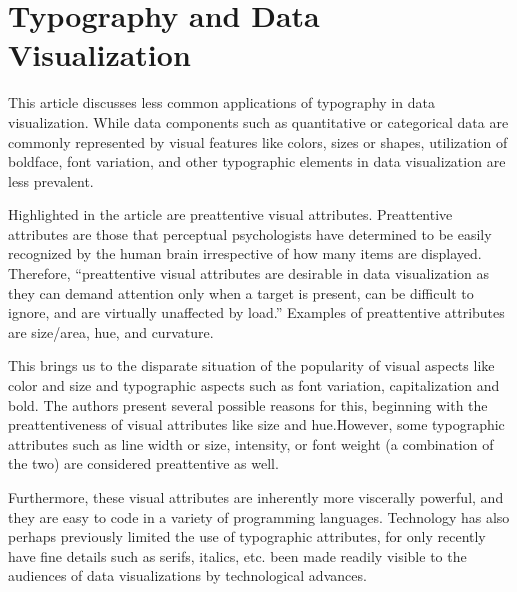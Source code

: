 \documentclass[]{book}
\theoremstyle{definition}
\theoremstyle{definition}
\theoremstyle{definition}
\theoremstyle{remark}
\begin{document}
\section{Typography and Data
Visualization}\label{typography-and-data-visualization}

This article discusses less common applications of typography in data
visualization. While data components such as quantitative or categorical
data are commonly represented by visual features like colors, sizes or
shapes, utilization of boldface, font variation, and other typographic
elements in data visualization are less prevalent.

Highlighted in the article are preattentive visual attributes.
Preattentive attributes are those that perceptual psychologists have
determined to be easily recognized by the human brain irrespective of
how many items are displayed. Therefore, ``preattentive visual
attributes are desirable in data visualization as they can demand
attention only when a target is present, can be difficult to ignore, and
are virtually unaffected by load.'' Examples of preattentive attributes
are size/area, hue, and curvature.

This brings us to the disparate situation of the popularity of visual
aspects like color and size and typographic aspects such as font
variation, capitalization and bold. The authors present several possible
reasons for this, beginning with the preattentiveness of visual
attributes like size and hue.However, some typographic attributes such
as line width or size, intensity, or font weight (a combination of the
two) are considered preattentive as well.

Furthermore, these visual attributes are inherently more viscerally
powerful, and they are easy to code in a variety of programming
languages. Technology has also perhaps previously limited the use of
typographic attributes, for only recently have fine details such as
serifs, italics, etc. been made readily visible to the audiences of data
visualizations by technological advances.
\end{document}
